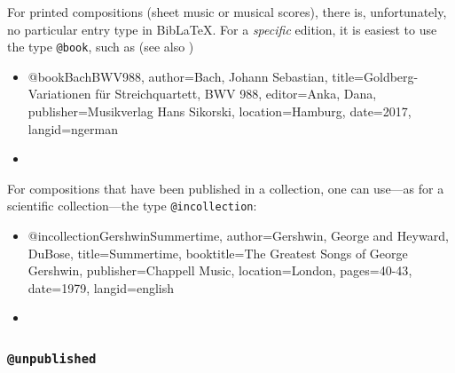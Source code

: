 For printed compositions (sheet music or musical scores), there is,
unfortunately, no particular entry type in BibLaTeX. For a \emph{specific}
edition, it is easiest to use the type \texttt{@book}, such as (see also
\cite{HaydnCelloConcerto2,ShostakovichOp110})
%
\begin{itemize}
\item[]
\begin{GenericCode}[numbers=none]
@book{BachBWV988,
  author={Bach, Johann Sebastian},
  title={Goldberg-Variationen für Streichquartett, BWV 988},
  editor={Anka, Dana},
  publisher={Musikverlag Hans Sikorski},
  location={Hamburg},
  date={2017},
  langid={ngerman}
}
\end{GenericCode}
\item[\cite{BachBWV988}] 
\end{itemize}
%
For compositions that have been published in a collection, one can use---as for
a scientific collection---the type \texttt{@incollection}:
%
\begin{itemize}
\item[]
\begin{GenericCode}[numbers=none]
@incollection{GershwinSummertime,
  author={Gershwin, George and Heyward, DuBose},
  title={Summertime},
  booktitle={The Greatest Songs of George Gershwin},
  publisher={Chappell Music},
  location={London},
  pages={40-43},
  date={1979},
  langid={english}
}
\end{GenericCode}
\item[\cite{GershwinSummertime}] 
\end{itemize}

\subsubsection{\texttt{\bfseries @unpublished}}
\label{sec:@unpublished}

